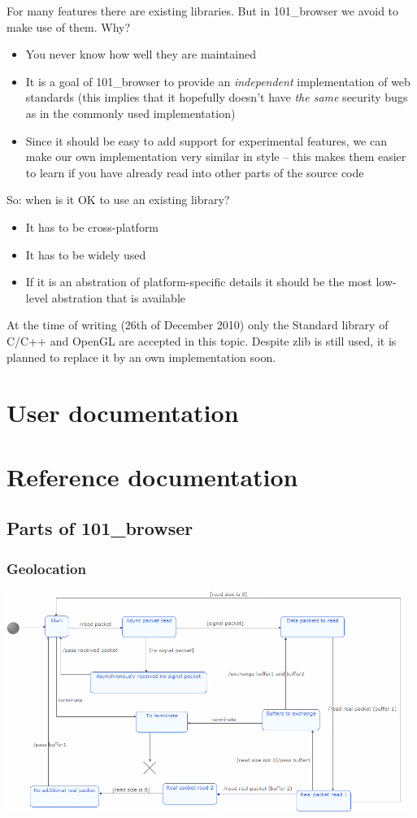 \documentclass[10pt]{scrbook}
\begin{document}
For many features there are existing libraries. But in 101\_browser we avoid to make use of them. Why?

\begin{itemize}
\item You never know how well they are maintained
\item It is a goal of 101\_browser to provide an \emph{independent} implementation of web standards (this implies that it hopefully doesn't have \emph{the same} security bugs as in the commonly used implementation)
\item Since it should be easy to add support for experimental features, we can make our own implementation very similar in style -- this makes them easier to learn if you have already read into other parts of the source code
\end{itemize}

So: when is it OK to use an existing library?
\begin{itemize}
\item It has to be cross-platform
\item It has to be widely used
\item If it is an abstration of platform-specific details it should be the most low-level abstration that is available
\end{itemize}
At the time of writing (26th of December 2010) only the Standard library of C/C++ and OpenGL are accepted in this topic. Despite zlib is still used, it is planned to replace it by an own implementation soon.

\part{User documentation}

\part{Reference documentation}

\chapter{Parts of 101\_browser}

\section{Geolocation}

\includegraphics[width=130mm]{uml/GeolocationGarminWin_state_machine.png}
\end{document}
